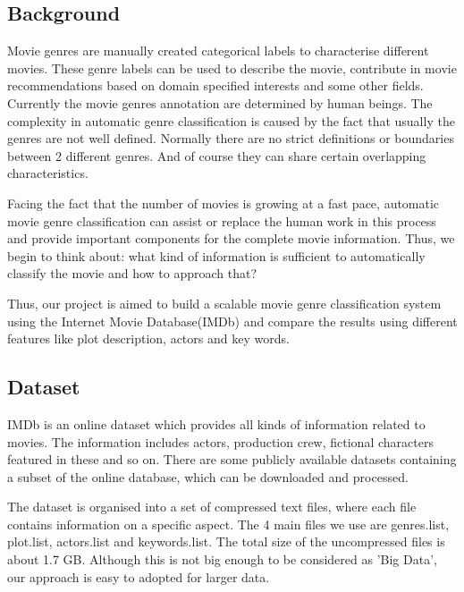\documentclass{vldb}
\begin{document}
\subsection{Background}
Movie genres are manually created categorical labels to characterise different movies. These genre labels can be used to describe the movie, contribute in movie recommendations based on domain specified interests and some other fields. Currently the movie genres annotation are determined by human beings. The complexity in automatic genre classification is caused by the fact that usually the genres are not well  defined. Normally there are no strict definitions or boundaries between 2 different genres.  And of course they can share certain overlapping characteristics.
\par Facing the fact that the number of movies is growing at a fast pace, automatic movie genre classification can assist or replace the human work in this process and provide important components for the complete movie information. Thus, we begin to think about: what kind of information is sufficient to automatically classify the movie and how to approach that?
\par Thus, our project is aimed to build a scalable movie genre classification system using the Internet Movie Database(IMDb) and compare the results using different features like plot description, actors and key words. 

\subsection{Dataset} 
IMDb is an online dataset which provides all kinds of information related to movies. The information includes actors, production crew, fictional characters featured in these and so on. There are some publicly available datasets containing a subset of the online database, which can be downloaded and processed. 
\par The dataset is organised into a set of compressed text files, where each file contains information on a specific aspect. The 4 main files we use are genres.list, plot.list, actors.list and keywords.list. The total size of the uncompressed files is about 1.7 GB. Although this is not big enough to be considered as 'Big Data', our approach is easy to adopted for larger data.
\end{document}
